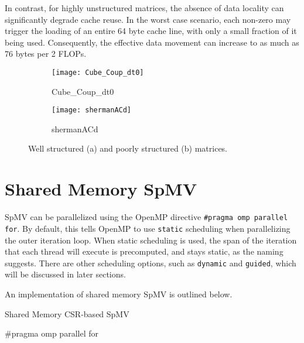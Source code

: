 In contrast, for highly unstructured matrices, the absence of data locality can significantly degrade cache reuse. In the worst case scenario, each non-zero may trigger the loading of an entire 64 byte cache line, with only a small fraction of it being used. Consequently, the effective data movement can increase to as much as 76 bytes per 2 FLOPs.

\begin{figure}[H]
    \centering
    \begin{subfigure}[t]{0.45\textwidth}
        \centering
        \texttt{[image: Cube\_Coup\_dt0]}
        \caption{Cube\_Coup\_dt0}
    \end{subfigure}
    \hfill
    \begin{subfigure}[t]{0.45\textwidth}
        \centering
        \texttt{[image: shermanACd]}
        \caption{shermanACd}
    \end{subfigure}
    \caption{Well structured (a) and poorly structured (b) matrices.}
    \label{fig:Cube_Coup_dt0}
\end{figure}

\section{Shared Memory SpMV}
SpMV can be parallelized using the OpenMP directive \texttt{\#pragma omp parallel for}. By default, this tells OpenMP to use \texttt{static} scheduling when parallelizing the outer iteration loop. When static scheduling is used, the span of the iteration that each thread will execute is precomputed, and stays static, as the naming suggests. There are other scheduling options, such as \texttt{dynamic} and \texttt{guided}, which will be discussed in later sections.
\medskip

An implementation of shared memory SpMV is outlined below.
\medskip

\begin{algorithm}[H]
    \caption{Shared Memory CSR-based SpMV}
    \SetAlgoVlined

    \#pragma omp parallel for\\
    \label{alg:sharedmemoryspmv}
\end{algorithm}

